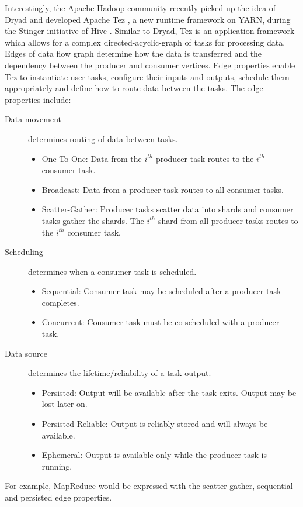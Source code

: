 \documentclass[11pt]{book}
\begin{document}
Interestingly, the Apache Hadoop community recently picked up the idea of Dryad and developed Apache Tez \cite{Tez, TezTutorial}, a new runtime framework on YARN, during the Stinger initiative of Hive \cite{Stinger}. Similar to Dryad, Tez is an application framework which allows for a complex directed-acyclic-graph of tasks for processing data. Edges of data flow graph determine how the data is transferred and the dependency between the producer and consumer vertices. Edge properties enable Tez to instantiate user tasks, configure their inputs and outputs, schedule them appropriately and define how to route data between the tasks. The edge properties include:
\begin{description}
\item[Data movement] determines routing of data between tasks.
\begin{itemize}
\item One-To-One: Data from the $i^{th}$ producer task routes to the $i^{th}$ consumer task.
\item Broadcast: Data from a producer task routes to all consumer tasks.
\item Scatter-Gather: Producer tasks scatter data into shards and consumer tasks gather the shards. The $i^{th}$ shard from all producer tasks routes to the $i^{th}$ consumer task.
\end{itemize}
\item[Scheduling] determines when a consumer task is scheduled.
\begin{itemize}
\item Sequential: Consumer task may be scheduled after a producer task completes.
\item Concurrent: Consumer task must be co-scheduled with a producer task.
\end{itemize}
\item[Data source] determines the lifetime/reliability of a task output.
\begin{itemize}
\item Persisted: Output will be available after the task exits. Output may be lost later on.
\item Persisted-Reliable: Output is reliably stored and will always be available.
\item Ephemeral: Output is available only while the producer task is running.
\end{itemize}
\end{description}
For example, MapReduce would be expressed with the scatter-gather, sequential and persisted edge properties. 
\end{document}
